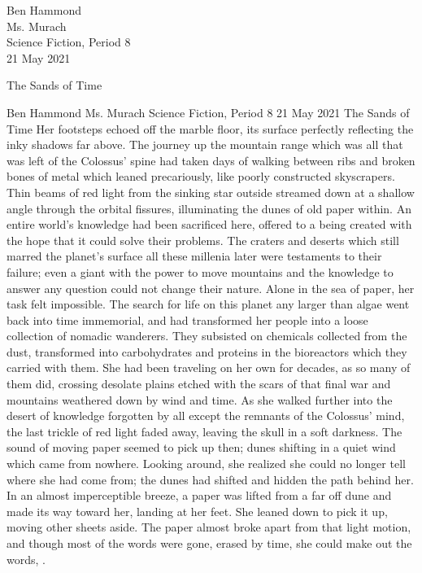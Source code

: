 \documentclass[12pt]{article}
\begin{document}
\begin{flushleft}

Ben Hammond\\
Ms. Murach\\
Science Fiction, Period 8\\
21 May 2021\\


\begin{center}
The Sands of Time
\end{center}


\setlength{\parindent}{0.5in}

Ben Hammond
Ms. Murach
Science Fiction, Period 8
21 May 2021
The Sands of Time
Her footsteps echoed off the marble floor, its surface perfectly reflecting the inky shadows far above. The journey up the mountain range which was all that was left of the Colossus’ spine had taken days of walking between ribs and broken bones of metal which leaned precariously, like poorly constructed skyscrapers. Thin beams of red light from the sinking star outside streamed down at a shallow angle through the orbital fissures, illuminating the dunes of old paper within. An entire world’s knowledge had been sacrificed here, offered to a being created with the hope that it could solve their problems. The craters and deserts which still marred the planet’s surface all these millenia later were testaments to their failure; even a giant with the power to move mountains and the knowledge to answer any question could not change their nature. 
Alone in the sea of paper, her task felt impossible. The search for life on this planet any larger than algae went back into time immemorial, and had transformed her people into a loose collection of nomadic wanderers. They subsisted on chemicals collected from the dust, transformed into carbohydrates and proteins in the bioreactors which they carried with them. She had been traveling on her own for decades, as so many of them did, crossing desolate plains etched with the scars of that final war and mountains weathered down by wind and time. 
As she walked further into the desert of knowledge forgotten by all except the remnants of the Colossus' mind, the last trickle of red light faded away, leaving the skull in a soft darkness. The sound of moving paper seemed to pick up then; dunes shifting in a quiet wind which came from nowhere. Looking around, she realized she could no longer tell where she had come from; the dunes had shifted and hidden the path behind her. In an almost imperceptible breeze, a paper was lifted from a far off dune and made its way toward her, landing at her feet. She leaned down to pick it up, moving other sheets aside. The paper almost broke apart from that light motion, and though most of the words were gone, erased by time, she could make out the words, .

\end{flushleft}
\end{document}
